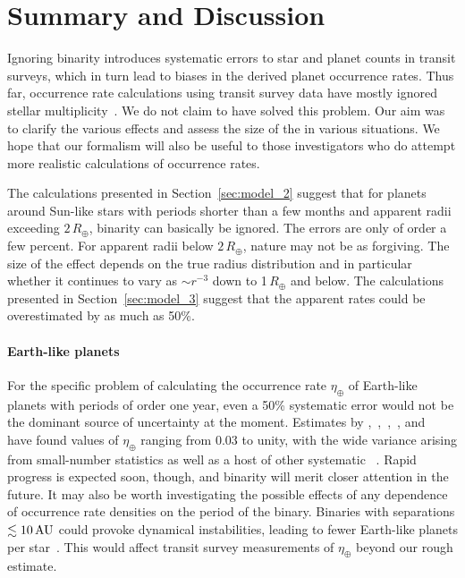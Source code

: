 \documentclass[12pt,modern,trackchanges]{aastex61}
\begin{document}

\section{Summary and Discussion}
\label{sec:discussion}

Ignoring binarity introduces systematic errors to star and planet
counts in transit surveys, which in turn lead to biases in the derived
planet occurrence rates.  Thus far, occurrence rate calculations using
transit survey data have mostly ignored stellar
multiplicity~\citep[\textit{e.g.},][]{howard_planet_2012,fressin_false_2013,foreman-mackey_exoplanet_2014,dressing_occurrence_2015,burke_terrestrial_2015}.
We do not claim to have solved this problem. Our aim was to clarify
the various effects and assess the size of the 
 in various
situations. We hope that our formalism will also be useful to those
investigators who do attempt more realistic calculations of occurrence
rates.

The calculations presented in Section~\ref{sec:model_2} suggest that
for planets around Sun-like stars with periods shorter than a few
months and apparent radii exceeding $2\,R_\oplus$, binarity can
basically be ignored.  The errors are only of order a few percent.
For apparent radii below $2\,R_\oplus$, nature may not be as
forgiving.  The size of the effect depends on the true radius
distribution and in particular whether it continues to vary as
$\sim$$r^{-3}$ down to 1\,$R_\oplus$ and below.  The calculations
presented in Section~\ref{sec:model_3} suggest that the apparent rates
could be overestimated by as much as 50\%.

\paragraph{Earth-like planets} For the specific problem of calculating
the occurrence rate $\eta_\oplus$ of Earth-like planets with periods
of order one year, even a 50\% systematic error would not be the
dominant source of uncertainty at the moment.  Estimates by
\citet{youdin_exoplanet_2011},~\citet{petigura_prevalence_2013},~\citet{dong_fast_2013},~\citet{foreman-mackey_exoplanet_2014},
and~\citet{burke_terrestrial_2015} have found values of $\eta_\oplus$
ranging from $0.03$ to unity, with the wide variance arising from
small-number statistics as well as a host of other systematic
~\citep[see][Figure~17]{burke_terrestrial_2015}.
  Rapid progress
is expected soon, though, and binarity will merit closer attention in
the future.  It may also be worth investigating the possible effects
of any dependence of occurrence rate densities on the period of the
binary.  Binaries with separations $\lesssim 10\,{\rm AU}$ could
provoke dynamical instabilities, leading to fewer Earth-like planets
per
star~\citep[\textit{e.g.},][]{holman_long-term_1999,wang_influence_2014,
kraus_impact_2016}.  This would affect transit survey measurements of
$\eta_\oplus$ beyond our rough estimate.
\end{document}

